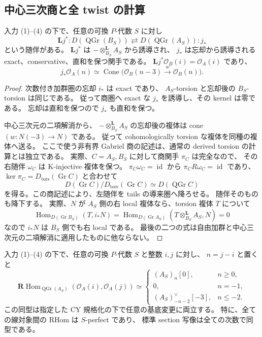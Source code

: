 \subsection{中心三次商と全 twist の計算}

\begin{lemma}
\label{lem:relative-central-quotient-derived-adjunction}
入力 (1)--(4) の下で、任意の可換 $P$-代数 $S$ に対し
\[
 \mathbf L j^*:D(\operatorname{QGr}(B_S))
 \rightleftarrows D(\operatorname{QGr}(A_S)):j_*
\]
という随伴がある。
$\mathbf L j^*$ は $-\otimes_{B_S}^{\mathbf L}A_S$ から誘導され、
$j_*$ は忘却から誘導される exact、conservative、直和を保つ関手である。
$\mathbf L j^*\mathcal O_B(i)=\mathcal O_A(i)$ であり、
\[
 j_*\mathcal O_A(n)
 \simeq\operatorname{Cone}\bigl(
  \mathcal O_B(n-3)\xrightarrow{\,w\,}\mathcal O_B(n)\bigr).
\]
\end{lemma}

\begin{proof}
次数付き加群圏の忘却 $i_*$ は exact であり、
$A_S$-torsion と忘却後の $B_S$-torsion は同じである。
従って商圏へ exact な $j_*$ を誘導し、その kernel は零である。
忘却は直和を保つので $j_*$ も直和を保つ。

中心三次元の二項解消から、
$-\otimes_{B_S}^{\mathbf L}A_S$ の忘却後の複体は
cone$(w:N(-3)\to N)$ である。
従って cohomologically torsion な複体を同種の複体へ送る。
ここで使う非有界 Gabriel 商の記述は、通常の derived torsion の計算とは独立である。
実際、$C=A_S,B_S$ に対して商関手 $\pi_C$ は完全なので、
その右随伴 $\omega_C$ は K-injective 複体を保つ。
$\pi_C\omega_C=\operatorname{id}$ から
$\pi_CR\omega_C=\operatorname{id}$ であり、
$\ker\pi_C=D_{\operatorname{tors}}(\operatorname{Gr}C)$ と合わせて
\[
 D(\operatorname{Gr}C)/D_{\operatorname{tors}}(\operatorname{Gr}C)
 \simeq D(\operatorname{QGr}C)
\]
を得る。この商記述により、左随伴を tails の導来圏へ降ろせる。
随伴そのものも降下する。
実際、$N$ が $A_S$ 側の右 local 複体なら、torsion 複体 $T$ について
\[
 \operatorname{Hom}_{D(\operatorname{Gr}B_S)}(T,i_*N)
 =\operatorname{Hom}_{D(\operatorname{Gr}A_S)}
      (T\otimes_{B_S}^{\mathbf L}A_S,N)=0
\]
なので $i_*N$ は $B_S$ 側でも右 local である。
最後の二つの式は自由加群と中心三次元の二項解消に適用したものに他ならない。
\end{proof}

\begin{theorem}[有限中心なしの普遍的線コホモロジー]
\label{thm:relative-cubic-universal-line-cohomology}
入力 (1)--(4) の下で、任意の可換 $P$-代数 $S$ と整数 $i,j$ に対し、
$n=j-i$ と置くと
\begin{equation}\label{eq:relative-cubic-all-line-rhom}
 \mathbf R\operatorname{Hom}_{\operatorname{QGr}(A_S)}
       (\mathcal O_A(i),\mathcal O_A(j))
 \simeq
 \begin{cases}
  (A_S)_n[0],& n\geq0,\\
  0,& n=-1,\\
  (A_S)_{-n-2}^\vee[-3],& n\leq-2.
 \end{cases}
\end{equation}
この同型は指定した CY 規格化の下で任意の基底変更に両立する。
特に、全ての線対象間の RHom は $S$-perfect であり、
標準 section 写像は全ての次数で同型である。
\end{theorem}

